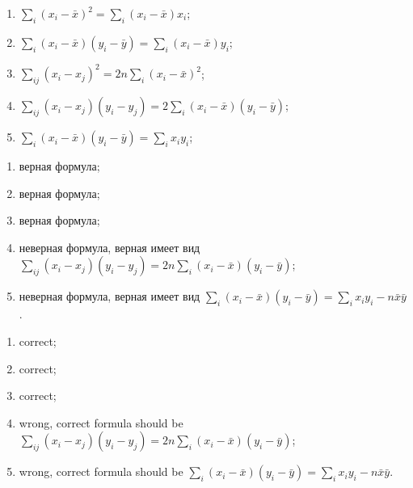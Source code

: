 \begin{problem}
\begin{enumerate}
\item $\sum_{i}(x_i - \bar x)^2 = \sum_i (x_i - \bar x) x_i$;
\item $\sum_{i}(x_i - \bar x)(y_i - \bar y) = \sum_i (x_i - \bar x) y_i$;
\item $\sum_{ij}(x_i - x_j)^2 = 2 n \sum_i(x_i - \bar x)^2$;
\item $\sum_{ij}(x_i - x_j)(y_i - y_j) = 2 \sum_i(x_i - \bar x)(y_i - \bar y)$;
\item $\sum_{i}(x_i - \bar x)(y_i - \bar y) = \sum_i x_i  y_i$;
\end{enumerate}

\begin{sol}
\begin{translationru}
\begin{enumerate}
\item верная формула;
\item верная формула;
\item верная формула;
\item неверная формула, верная имеет вид $\sum_{ij}(x_i - x_j)(y_i - y_j) = 2 n\sum_i(x_i - \bar x)(y_i - \bar y)$;
\item неверная формула, верная имеет вид $\sum_{i}(x_i - \bar x)(y_i - \bar y) = \sum_i x_i  y_i - n \bar x \bar y$.
\end{enumerate}            
\end{translationru}

\begin{translationen}
\begin{enumerate}
\item correct;
\item correct;
\item correct;
\item wrong, correct formula should be $\sum_{ij}(x_i - x_j)(y_i - y_j) = 2 n\sum_i(x_i - \bar x)(y_i - \bar y)$;
\item wrong, correct formula should be $\sum_{i}(x_i - \bar x)(y_i - \bar y) = \sum_i x_i  y_i - n \bar x \bar y$.
\end{enumerate}            
\end{translationen}
    
\end{sol}
\end{problem}
  


